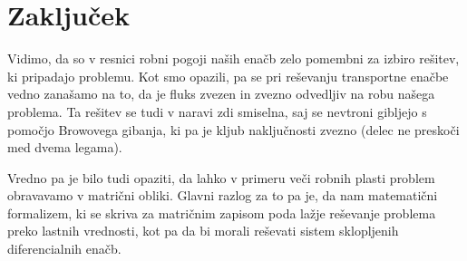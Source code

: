 \documentclass[slovene,11pt,a4paper]{article}
\begin{document}
\newpage

\section{Zaključek}
Vidimo, da so v resnici robni pogoji naših enačb zelo pomembni za izbiro rešitev, ki pripadajo problemu. Kot smo opazili, pa se pri reševanju transportne enačbe vedno zanašamo na to, da je fluks zvezen in zvezno odvedljiv na robu našega problema. Ta rešitev se tudi v naravi zdi smiselna, saj se nevtroni gibljejo s pomočjo Browovega gibanja, ki pa je kljub naključnosti zvezno (delec ne preskoči med dvema legama). 

Vredno pa je bilo tudi opaziti, da lahko v primeru veči robnih plasti problem obravavamo v matrični obliki. Glavni razlog za to pa je, da nam matematični formalizem, ki se skriva za matričnim zapisom poda lažje reševanje problema preko lastnih vrednosti, kot pa da bi morali reševati sistem sklopljenih diferencialnih enačb. 

\printbibliography


                                                                                                                                                                                                                                                                                                                                                                                                                                                                                                                                                                                                                                                                                                                                                                                                                                                                                                                                                                                                                                                                                                                                                                                                                                                                                                                                                                                                                                                                                                                                                                                                                 
\end{document}
